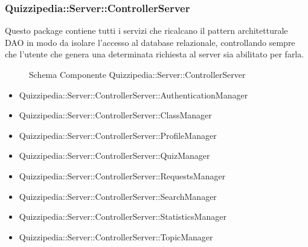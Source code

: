 \subsubsection{Quizzipedia::Server::ControllerServer}
Questo package contiene tutti i servizi che ricalcano il pattern architetturale DAO in modo da isolare l'accesso al database relazionale, controllando sempre che l'utente che genera una determinata richiesta al server sia abilitato per farla.
\begin{figure}[H]
\centering
\noindent{}
\caption{Schema Componente Quizzipedia::Server::ControllerServer}
\end{figure}
\begin{itemize}
\item Quizzipedia::Server::ControllerServer::AuthenticationManager
\item Quizzipedia::Server::ControllerServer::ClassManager
\item Quizzipedia::Server::ControllerServer::ProfileManager
\item Quizzipedia::Server::ControllerServer::QuizManager
\item Quizzipedia::Server::ControllerServer::RequestsManager
\item Quizzipedia::Server::ControllerServer::SearchManager
\item Quizzipedia::Server::ControllerServer::StatisticsManager
\item Quizzipedia::Server::ControllerServer::TopicManager
\end{itemize}
